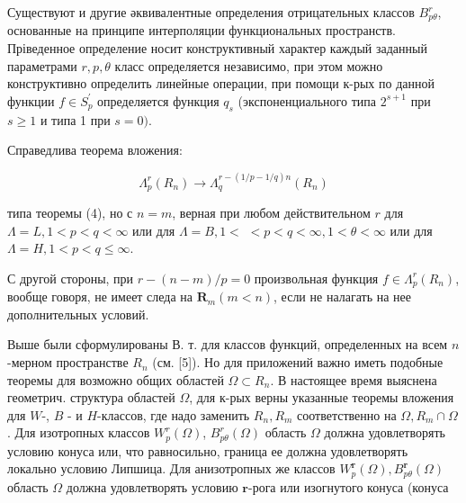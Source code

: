 \documentclass[10pt]{article}
\begin{document}
Существуют и другие әквивалентные определения отрицательных классов $B_{p \theta}^{r}$, основанные на принципе интерполяции функциональных пространств. Пріведенное определение носит конструктивный характер каждый заданный параметрами $r, p, \theta$ класс определяется независимо, при этом можно конструктивно определить линейные операции, при помощи к-рых по данной функции $f \in S_{p}^{\prime}$ определяется функция $q_{s}$ (экспоненциального типа $2^{s+1}$ при $s \geqslant 1$ и типа 1 при $s=0)$.



Справедлива теорема вложения:



\[

\Lambda_{p}^{r}\left(R_{n}\right) \longrightarrow \Lambda_{q}^{r-(1 / p-1 / q) n}\left(R_{n}\right)

\]



типа теоремы (4), но с $n=m$, верная при любом действительном $r$ для $\Lambda=L, 1<p<q<\infty$ или для $\Lambda=B, 1<$ $<p<q<\infty, 1<\theta<\infty$ или для $\Lambda=H, 1<p<q \leqslant \infty$.



С другой стороны, при $r-(n-m) / p=0$ произвольная функция $f \in \Lambda_{p}^{r}\left(R_{n}\right)$, вообще говоря, не имеет следа на $\boldsymbol{R}_{m}(m<n)$, если не налагать на нее дополнительных условий.



Выше были сформулированы В. т. для классов функций, определенных на всем $n$-мерном пространстве $R_{n}$ (см. [5]). Но для приложений важно иметь подобные теоремы для возможно общих областей $\Omega \subset R_{n}$. В настоящее время выяснена геометрич. структура областей $\Omega$, для к-рых верны указанные теоремы вложения для $W$-, $B$ - и $H$-классов, где надо заменить $R_{n}, R_{m}$ соответственно на $\Omega, R_{m} \cap \Omega$. Для изотропных классов $W_{p}^{r}(\Omega)$, $B_{p \theta}^{r}(\Omega)$ область $\Omega$ должна удовлетворять условию конуса или, что равносильно, граница ее должна удовлетворять локально условию Липшица. Для анизотропных же классов $W_{p}^{\boldsymbol{r}}(\Omega), B_{p \theta}^{\boldsymbol{r}}(\Omega)$ область $\Omega$ должна удовлетворять условию $\boldsymbol{r}$-рога или изогнутого конуса (конуса
\end{document}
